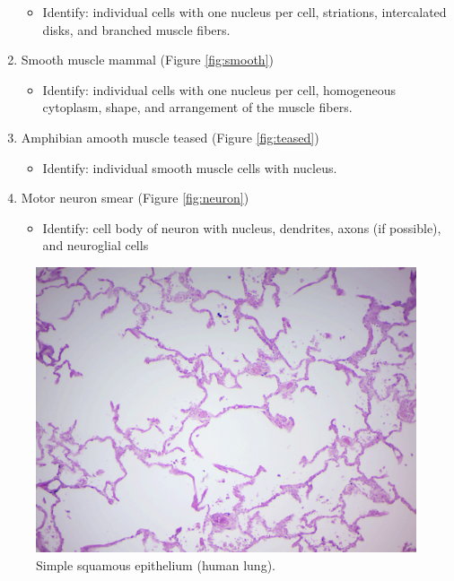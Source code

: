 \begin{enumerate}
  \begin{itemize}
  \tightlist
  \item
    Identify: individual cells with one nucleus per cell, striations,
    intercalated disks, and branched muscle fibers.
  \end{itemize}
\item
  Smooth muscle mammal (Figure \ref{fig:smooth})

  \begin{itemize}
  \tightlist
  \item
    Identify: individual cells with one nucleus per cell, homogeneous
    cytoplasm, shape, and arrangement of the muscle fibers.
  \end{itemize}
\item
  Amphibian amooth muscle teased (Figure \ref{fig:teased})

  \begin{itemize}
  \tightlist
  \item
    Identify: individual smooth muscle cells with nucleus.
  \end{itemize}
\item
  Motor neuron smear (Figure \ref{fig:neuron})

  \begin{itemize}
  \tightlist
  \item
    Identify: cell body of neuron with nucleus, dendrites, axons (if
    possible), and neuroglial cells
  \end{itemize}
\end{enumerate}

\begin{figure}

{\centering \includegraphics[width=0.7\linewidth]{./figures/tissues/lung_simple_squamous}

}

\caption{Simple squamous epithelium (human lung).}\label{fig:lung}
\end{figure}

